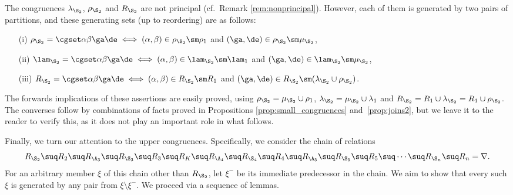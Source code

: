 \begin{rem}
\label{NotPrinc}
The congruences $\lambda_{\S_2}$, $\rho_{\S_2}$ and $R_{\S_2}$ are not principal (cf.~Remark \ref{rem:nonprincipal}). 
However, each of them is generated by two pairs of partitions, and these generating sets (up to reordering) are as follows:
\begin{itemize}
\item[(i)] $\rho_{\S_2}=\cgset\alpha\beta\ga\de\iff (\alpha,\beta)\in\rho_{\S_2}\sm \rho_1$ and $(\ga,\de)\in \rho_{\S_2}\sm\mu_{\S_2}$,
\item[(ii)] $\lam_{\S_2}=\cgset\alpha\beta\ga\de\iff (\alpha,\beta)\in\lam_{\S_2}\sm \lam_1$ and $(\ga,\de)\in \lam_{\S_2}\sm\mu_{\S_2}$,
\item[(iii)] $R_{\S_2}=\cgset\alpha\beta\ga\de\iff (\alpha,\beta)\in R_{\S_2}\sm R_1$ and $(\ga,\de)\in R_{\S_2}\sm (\lambda_{\S_2}\cup\rho_{\S_2})$.
\end{itemize}
The forwards implications of these assertions are easily proved, using $\rho_{\S_2}=\mu_{\S_2}\cup\rho_1$,
$\lambda_{\S_2}=\mu_{\S_2}\cup\lambda_1$ and $R_{\S_2}=R_1\cup \lambda_{\S_2}=R_1\cup\rho_{\S_2}$.  
%
The converses follow by combinations of facts proved in Propositions \ref{prop:small_congruences} and~\ref{prop:joins2}, but we leave it to the reader to verify this, as it does not play an important role in what follows.
\end{rem}



Finally, we turn our attention to the upper congruences. Specifically, we consider the chain of relations
\begin{equation}
\label{eqaa1}
R_{\S_2}\suq R_2 \suq R_{\A_3}\suq R_{\S_3}\suq
R_3\suq R_K \suq R_{\A_4}\suq R_{\S_4}\suq
R_4\suq R_{\A_5}\suq R_{\S_5}\suq R_5\suq\cdots
\suq R_{\S_n}\suq R_n=\nabla.
\end{equation}
For an arbitrary member $\xi$ of this chain other than $R_{\S_2}$, let
$\xi^-$ be its immediate predecessor in the chain. 
We aim to show that every such $\xi$ is generated by any pair from $\xi\setminus \xi^-$.
We proceed via  a sequence of lemmas. 


